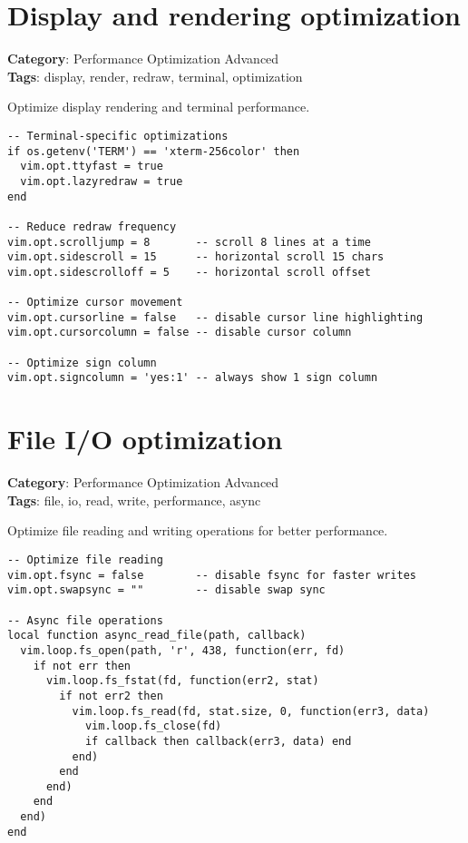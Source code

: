 {{{{{{{{{\section{Display and rendering optimization}

\textbf{Category}: Performance Optimization Advanced\\ \textbf{Tags}: display, render, redraw, terminal, optimization
\vspace{0.5cm}

Optimize display rendering and terminal performance.

\begin{Exa*}{}
\begin{Verbatim}[fontsize=\footnotesize, breaklines, breakanywhere]
-- Terminal-specific optimizations
if os.getenv('TERM') == 'xterm-256color' then
  vim.opt.ttyfast = true
  vim.opt.lazyredraw = true
end

-- Reduce redraw frequency
vim.opt.scrolljump = 8       -- scroll 8 lines at a time
vim.opt.sidescroll = 15      -- horizontal scroll 15 chars
vim.opt.sidescrolloff = 5    -- horizontal scroll offset

-- Optimize cursor movement
vim.opt.cursorline = false   -- disable cursor line highlighting
vim.opt.cursorcolumn = false -- disable cursor column

-- Optimize sign column
vim.opt.signcolumn = 'yes:1' -- always show 1 sign column
\end{Verbatim}
\end{Exa*}

\section{File I/O optimization}

\textbf{Category}: Performance Optimization Advanced\\ \textbf{Tags}: file, io, read, write, performance, async
\vspace{0.5cm}

Optimize file reading and writing operations for better performance.

\begin{Exa*}{}
\begin{Verbatim}[fontsize=\footnotesize, breaklines, breakanywhere]
-- Optimize file reading
vim.opt.fsync = false        -- disable fsync for faster writes
vim.opt.swapsync = ""        -- disable swap sync

-- Async file operations
local function async_read_file(path, callback)
  vim.loop.fs_open(path, 'r', 438, function(err, fd)
    if not err then
      vim.loop.fs_fstat(fd, function(err2, stat)
        if not err2 then
          vim.loop.fs_read(fd, stat.size, 0, function(err3, data)
            vim.loop.fs_close(fd)
            if callback then callback(err3, data) end
          end)
        end
      end)
    end
  end)
end
\end{Verbatim}
\end{Exa*}

}}}}}}}}}
